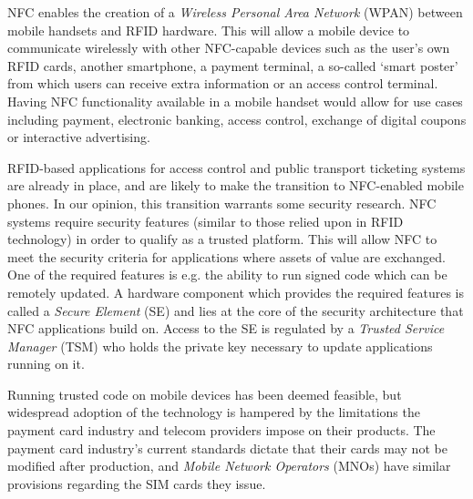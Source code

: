 NFC enables the creation of a \textit{Wireless Personal Area Network} (WPAN) between mobile handsets and RFID hardware.
This will allow a mobile device to communicate wirelessly with other NFC-capable devices such as the user's own RFID cards, another smartphone, a payment terminal, a so-called `smart poster' from which users can receive extra information or an access control terminal.
Having NFC functionality available in a mobile handset would allow for use cases including payment, electronic banking, access control, exchange of digital coupons or interactive advertising.

RFID-based applications for access control and public transport ticketing systems are already in place, and are likely to make the transition to NFC-enabled mobile phones.
In our opinion, this transition warrants some security research.
NFC systems require security features (similar to those relied upon in RFID technology) in order to qualify as a trusted platform. This will allow NFC to meet the security criteria for applications where assets of value are exchanged. One of the required features is e.g. the ability to run signed code which can be remotely updated.
A hardware component which provides the required features is called a \textit{Secure Element} (SE) and lies at the core of the security architecture that NFC applications build on.
Access to the SE is regulated by a \textit{Trusted Service Manager} (TSM) who holds the private key necessary to update applications running on it.

Running trusted code on mobile devices has been deemed feasible, but widespread adoption of the technology is hampered by the limitations the payment card industry and telecom providers impose on their products.
The payment card industry's current standards dictate that their cards may not be modified after production, and \textit{Mobile Network Operators} (MNOs) have similar provisions regarding the SIM cards they issue.


